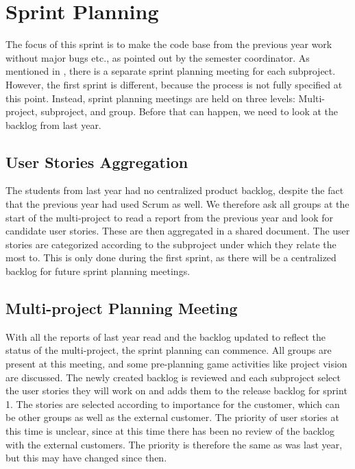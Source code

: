 \chapter{Sprint Planning}\label{chap:sprint1_planning}
The focus of this sprint is to make the code base from the previous year work without major bugs etc., as pointed out by the semester coordinator. As mentioned in , there is a separate sprint planning meeting for each subproject. However, the first sprint is different, because the process is not fully specified at this point. Instead, sprint planning meetings are held on three levels: Multi-project, subproject, and group. Before that can happen, we need to look at the backlog from last year.

\section{User Stories Aggregation}
The students from last year had no centralized product backlog, despite the fact that the previous year had used Scrum as well. We therefore ask all groups at the start of the multi-project to read a report from the previous year and look for candidate user stories. These are then aggregated in a shared document. The user stories are categorized according to the subproject under which they relate the most to. This is only done during the first sprint, as there will be a centralized backlog for future sprint planning meetings.

\section{Multi-project Planning Meeting}
With all the reports of last year read and the backlog updated to reflect the status of the multi-project, the sprint planning can commence. All groups are present at this meeting, and some pre-planning game activities like project vision are discussed. The newly created backlog is reviewed and each subproject select the user stories they will work on and adds them to the release backlog for sprint 1. The stories are selected according to importance for the customer, which can be other groups as well as the external customer. The priority of user stories at this time is unclear, since at this time there has been no review of the backlog with the external customers. The priority is therefore the same as was last year, but this may have changed since then.

